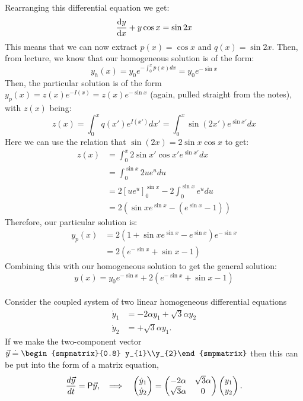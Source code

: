\documentclass{article}
\begin{document}
\begin{solution}
	Rearranging this differential equation we get:
	\[
		\dv{y}{x} + y \cos x = \sin 2x
	\] 
	This means that we can now extract $p(x) = \cos x$ and $q(x) = \sin 2x$. Then, from lecture, we know that our
	homogeneous solution is of the form:
	\[
		y_h(x) = y_0e^{-\int_0^x p(x) dx} = y_0e^{-\sin x}
	\] 
	Then, the particular solution is of the form $y_p(x) = z(x)e^{-I(x)} = z(x) e^{-\sin x}$ (again, pulled
	straight from the notes), with $z(x)$ being:
	\[
		z(x) = \int_0^x q(x') e^{I(x')} dx' = \int_0^x \sin(2x') e^{\sin x'} dx
	\] 
	Here we can use the relation that $\sin(2x) = 2 \sin x \cos x$ to get:
	\begin{align*}
		z(x) &= \int_0^x 2 \sin x' \cos x' e^{\sin x'} dx\\
			 &= \int_0^{\sin x} 2ue^u du \\
			 &= 2 \left[ u e^u\right]_0^{\sin x} - 2\int_0^{\sin x} e^u du \\
			 &= 2(\sin x e^{\sin x} - (e^{\sin x} -1)) 
	\end{align*}
	Therefore, our particular solution is:
	\begin{align*}
		y_p(x) &= 2(1 + \sin x e^{\sin x} - e^{\sin x} )e^{-\sin x} \\
			   &= 2(e^{- \sin x} + \sin x - 1) 
	\end{align*} 
	Combining this with our homogeneous solution to get the general solution:
	\[
		y(x) = y_0e^{-\sin x} + 2(e^{-\sin x} + \sin x - 1)
	\] 
\end{solution}

\phline
\paragraph{}
Consider the coupled system of two linear homogeneous differential equations
	\begin{align*}
		\dot{y}_{1} &= -2\alpha y_{1} + \sqrt{3}\alpha y_{2}\\
		\dot{y}_{2} &= +\sqrt{3}\alpha y_{1}.
	\end{align*}
If we make the two-component vector $\vec{y} \doteq \begin{smpmatrix}{0.8} y_{1}\\y_{2}\end{smpmatrix}$ then this can be put into the form of a matrix equation,
	\begin{equation*}
		\frac{d\vec{y}}{dt} = \mathsf{P}\vec{y},	\quad \Longrightarrow \quad		\begin{pmatrix} \dot{y}_{1} \\ \dot{y}_{2} \end{pmatrix} = \begin{pmatrix} -2\alpha & \sqrt{3}\alpha \\ 
		\sqrt{3}\alpha & 0 \end{pmatrix}\begin{pmatrix} y_{1}\\y_{2}\end{pmatrix}.
	\end{equation*}
\end{document}
